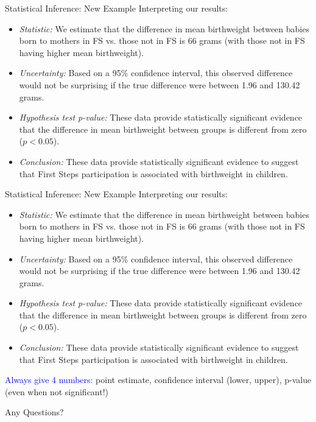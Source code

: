 \documentclass[10pt,t]{beamer}
\begin{document}
\begin{frame}{Statistical Inference: New Example}
Interpreting our results:

\vspace{0.3cm}

\begin{itemize}
	\item \textit{Statistic:} We estimate that the difference in mean birthweight between babies born to mothers in FS vs. those not in FS is 66 grams (with those not in FS having higher mean birthweight).
	\item \textit{Uncertainty:} Based on a 95\% confidence interval, this observed difference would not be surprising if the true difference were between 1.96 and 130.42 grams.
	\item \textit{Hypothesis test p-value:} These data provide statistically significant evidence that the difference in mean birthweight between groups is different from zero ($p < 0.05$).
	\item \textit{Conclusion:} These data provide statistically significant evidence to suggest that First Steps participation is associated with birthweight in children.
\end{itemize}

\end{frame}

\begin{frame}{Statistical Inference: New Example}
Interpreting our results:

\vspace{0.3cm}

\begin{itemize}
	\item \textit{Statistic:} We estimate that the difference in mean birthweight between babies born to mothers in FS vs. those not in FS is 66 grams (with those not in FS having higher mean birthweight).
	\item \textit{Uncertainty:} Based on a 95\% confidence interval, this observed difference would not be surprising if the true difference were between 1.96 and 130.42 grams.
	\item \textit{Hypothesis test p-value:} These data provide statistically significant evidence that the difference in mean birthweight between groups is different from zero ($p < 0.05$).
	\item \textit{Conclusion:} These data provide statistically significant evidence to suggest that First Steps participation is associated with birthweight in children.
\end{itemize}

\vspace{0.3cm}

\textcolor{blue}{Always give 4 numbers:} point estimate, confidence interval (lower, upper), p-value (even when not significant!)

\end{frame}

\begin{frame}[c]
\centering \huge Any Questions?
\end{frame}
\end{document}
